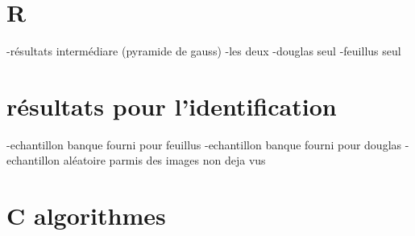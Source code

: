 \documentclass{article}
\begin{document}
\begin{appendix}
	\section{R}	
		-résultats intermédiare (pyramide de gauss)
		-les deux 
		-douglas seul 
		-feuillus seul
	
	\section{résultats pour l'identification}
		-echantillon banque fourni pour feuillus
		-echantillon banque fourni pour douglas 
		-echantillon aléatoire parmis des images non deja vus

	\section{C algorithmes}
\end{appendix}
\end{document}
